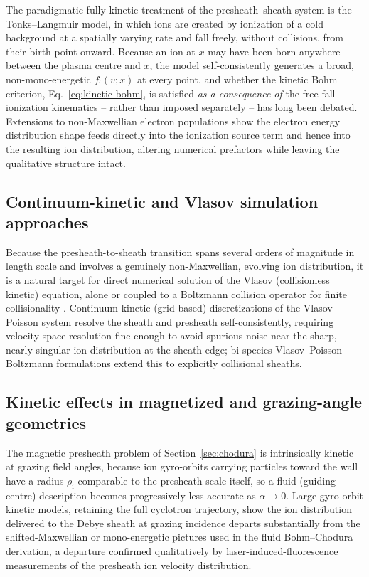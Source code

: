 The paradigmatic fully kinetic treatment of the presheath--sheath system is the Tonks--Langmuir model, in which ions are created by ionization of a cold background at a spatially varying rate and fall freely, without collisions, from their birth point onward. Because an ion at $x$ may have been born anywhere between the plasma centre and $x$, the model self-consistently generates a broad, non-mono-energetic $f_{\mathrm{i}}(v;x)$ at every point, and whether the kinetic Bohm criterion, Eq.~\eqref{eq:kinetic-bohm}, is satisfied \emph{as a consequence of} the free-fall ionization kinematics -- rather than imposed separately -- has long been debated. Extensions to non-Maxwellian electron populations show the electron energy distribution shape feeds directly into the ionization source term and hence into the resulting ion distribution, altering numerical prefactors while leaving the qualitative structure intact.

\subsection{Continuum-kinetic and Vlasov simulation approaches}

Because the presheath-to-sheath transition spans several orders of magnitude in length scale and involves a genuinely non-Maxwellian, evolving ion distribution, it is a natural target for direct numerical solution of the Vlasov (collisionless kinetic) equation, alone or coupled to a Boltzmann collision operator for finite collisionality \cite{ref0670}. Continuum-kinetic (grid-based) discretizations of the Vlasov--Poisson system resolve the sheath and presheath self-consistently, requiring velocity-space resolution fine enough to avoid spurious noise near the sharp, nearly singular ion distribution at the sheath edge; bi-species Vlasov--Poisson--Boltzmann formulations extend this to explicitly collisional sheaths.

\subsection{Kinetic effects in magnetized and grazing-angle geometries}

The magnetic presheath problem of Section~\ref{sec:chodura} is intrinsically kinetic at grazing field angles, because ion gyro-orbits carrying particles toward the wall have a radius $\rho_{\mathrm{i}}$ comparable to the presheath scale itself, so a fluid (guiding-centre) description becomes progressively less accurate as $\alpha \to 0$. Large-gyro-orbit kinetic models, retaining the full cyclotron trajectory, show the ion distribution delivered to the Debye sheath at grazing incidence departs substantially from the shifted-Maxwellian or mono-energetic pictures used in the fluid Bohm--Chodura derivation, a departure confirmed qualitatively by laser-induced-fluorescence measurements of the presheath ion velocity distribution.


